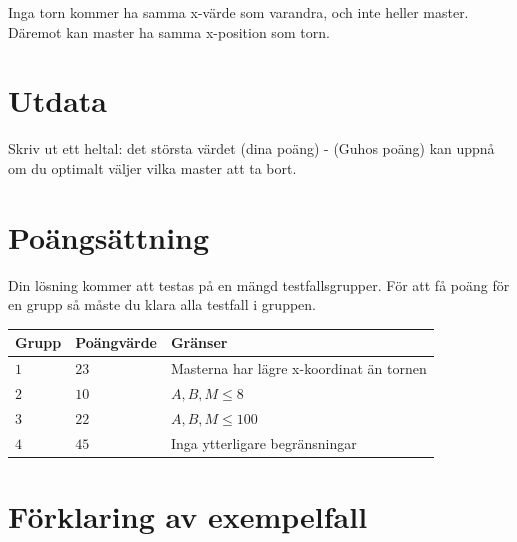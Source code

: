 Inga torn kommer ha samma x-värde som varandra, och inte heller master.
Däremot kan master ha samma x-position som torn.

\section*{Utdata}
Skriv ut ett heltal: det största värdet (dina poäng) - (Guhos poäng) kan uppnå om du optimalt väljer vilka master att ta bort.

\section*{Poängsättning}
Din lösning kommer att testas på en mängd testfallsgrupper.
För att få poäng för en grupp så måste du klara alla testfall i gruppen.

\noindent
\begin{tabular}{| l | l | p{12cm} |}
  \hline
  Grupp & Poängvärde & Gränser \\ \hline
  $1$   & $23$       & Masterna har lägre x-koordinat än tornen \\ \hline
  $2$   & $10$       & $A,B,M \leq 8$\\ \hline
  $3$   & $22$       & $A,B,M \leq 100$  \\ \hline
  $4$   & $45$       & Inga ytterligare begränsningar  \\ \hline
\end{tabular}

\section*{Förklaring av exempelfall}

